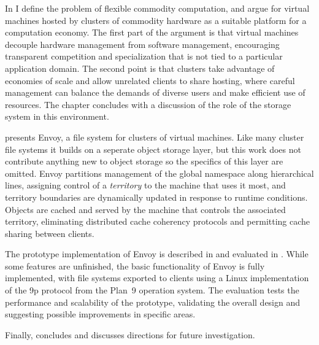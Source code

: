 In  I define the problem of flexible commodity computation, and argue for virtual machines hosted by clusters of commodity hardware as a suitable platform for a computation economy. The first part of the argument is that virtual machines decouple hardware management from software management, encouraging transparent competition and specialization that is not tied to a particular application domain. The second point is that clusters take advantage of economies of scale and allow unrelated clients to share hosting, where careful management can balance the demands of diverse users and make efficient use of resources. The chapter concludes with a discussion of the role of the storage system in this environment.

 presents Envoy, a file system for clusters of virtual machines. Like many cluster file systems it builds on a seperate object storage layer, but this work does not contribute anything new to object storage so the specifics of this layer are omitted. Envoy partitions management of the global namespace along hierarchical lines, assigning control of a \emph{territory} to the machine that uses it most, and territory boundaries are dynamically updated in response to runtime conditions. Objects are cached and served by the machine that controls the associated territory, eliminating distributed cache coherency protocols and permitting cache sharing between clients.

The prototype implementation of Envoy is described in  and evaluated in . While some features are unfinished, the basic functionality of Envoy is fully implemented, with file systems exported to clients using a Linux implementation of the 9p protocol from the Plan~9 operation system. The evaluation tests the performance and scalability of the prototype, validating the overall design and  suggesting possible improvements in specific areas.

Finally,  concludes and discusses directions for future investigation.